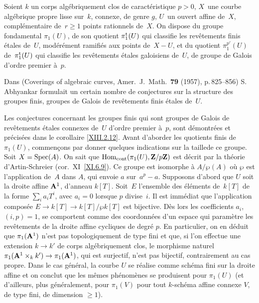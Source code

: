 \begin{remarqueMR}
\label{XIII.2.13}
Soient $k$ un corps alg\'ebriquement clos de caract\'eristique $p>0$, $X$~une courbe alg\'ebrique propre lisse sur~$k$, connexe, de genre $g$, $U$~un ouvert affine de~$X$, compl\'ementaire de~$r\geq1$ points rationnels
de~$X$. On dispose du groupe fondamental $\pi_1(U)$, de son quotient
$\pi_1^{\tame}(U)$ qui classifie les rev\^etements finis \'etales de~$U$,
mod\'er\'ement ramifi\'es aux points de~$X-U$, et du quotient
$\pi_1^{p'}(U)$ de~$\pi_1^{\tame}(U)$ qui classifie les rev\^etements \'etales
galoisiens de~$U$, de groupe de Galois d'ordre premier \`a~$p$.

Dans (Coverings of algebraic curves, Amer.\ J.~Math.\ \textbf{79}
(1957), p.\,825--856) S.\, Abhyankar formulait un certain nombre de conjectures sur la structure des groupes finis, groupes de Galois de rev\^etements finis
\'etales de~$U$.

Les conjectures concernant les groupes finis qui sont groupes de
Galois de rev\^etements \'etales connexes de~$U$ d'ordre premier \`a~$p$,
sont d\'emontr\'ees et pr\'ecis\'ees dans le corollaire \ref{XIII.2.12}. Avant d'aborder les quotients finis de~$\pi_1(U)$, commen\c{c}ons par donner quelques
indications sur la \og taille\fg de ce groupe. Soit $X = \Spec(A)$. On
sait que $\Hom_{\mathrm{cont}}(\pi_1(U), \ZZ/p\ZZ)$ est d\'ecrit par
la th\'eorie d'Artin-Schreier (cor.\, XI~\ref{XI.6.9}). Ce groupe est
isomorphe \`a $A/\wp(A)$ o\`u $\wp$ est l'application de~$A$ dans $A$, qui
envoie $a$ sur~$a^p-a$. Supposons d'abord que $U$ soit la droite
affine $\AA^1$, d'anneau $k[T]$. Soit~$E$ l'ensemble des
\'el\'ements de~$k[T]$ de la forme $\sum_i a_iT^i$, avec $a_i = 0$
lorsque $p$ divise~$i$. Il est imm\'ediat que l'application compos\'ee
$E\to k[T]\to k[T]/\wp k[T]$ est bijective. D\`es lors les coefficients
$a_i$, $(i,p)=1$, se comportent comme des coordonn\'ees d'un espace qui
param\`etre les rev\^etements de la droite affine cycliques de degr\'e
$p$. En particulier, on en d\'eduit que $\pi_1(\AA^1)$ n'est pas
topologiquement de type fini et que, si l'on effectue une extension
$k\to k'$ de corps alg\'ebriquement clos, le morphisme naturel $\pi_1(\AA^1\times_kk')\to\pi_1(\AA^1)$, qui est surjectif, n'est pas bijectif,
contrairement au cas propre. Dans le cas g\'en\'eral, la courbe $U$ se
r\'ealise comme sch\'ema fini sur la droite affine et on conclut que les
m\^emes ph\'enom\`enes se produisent pour $\pi_1(U)$ (et d'ailleurs, plus
g\'en\'eralement, pour $\pi_1(V)$ pour tout $k$-sch\'ema affine connexe $V$,
de type fini, de dimension $\geq1$).


\end{remarqueMR}
